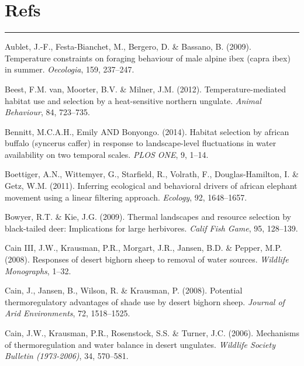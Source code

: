 \documentclass[10pt,twocolumn]{paper}
\begin{document}
\section{Refs}\label{refs}

\begin{center}\rule{0.5\linewidth}{\linethickness}\end{center}

\hypertarget{refs}{}
\hypertarget{ref-Aublet2009}{}
Aublet, J.-F., Festa-Bianchet, M., Bergero, D. \& Bassano, B. (2009).
Temperature constraints on foraging behaviour of male alpine ibex (capra
ibex) in summer. \emph{Oecologia}, 159, 237--247.

\hypertarget{ref-VANBEEST2012723}{}
Beest, F.M. van, Moorter, B.V. \& Milner, J.M. (2012).
Temperature-mediated habitat use and selection by a heat-sensitive
northern ungulate. \emph{Animal Behaviour}, 84, 723--735.

\hypertarget{ref-bennitt2014buffalo}{}
Bennitt, M.C.A.H., Emily AND Bonyongo. (2014). Habitat selection by
african buffalo (syncerus caffer) in response to landscape-level
fluctuations in water availability on two temporal scales. \emph{PLOS
ONE}, 9, 1--14.

\hypertarget{ref-ECY:ECY20119281648}{}
Boettiger, A.N., Wittemyer, G., Starfield, R., Volrath, F.,
Douglas-Hamilton, I. \& Getz, W.M. (2011). Inferring ecological and
behavioral drivers of african elephant movement using a linear filtering
approach. \emph{Ecology}, 92, 1648--1657.

\hypertarget{ref-bowyer2009thermal}{}
Bowyer, R.T. \& Kie, J.G. (2009). Thermal landscapes and resource
selection by black-tailed deer: Implications for large herbivores.
\emph{Calif Fish Game}, 95, 128--139.

\hypertarget{ref-cain2008responses}{}
Cain III, J.W., Krausman, P.R., Morgart, J.R., Jansen, B.D. \& Pepper,
M.P. (2008). Responses of desert bighorn sheep to removal of water
sources. \emph{Wildlife Monographs}, 1--32.

\hypertarget{ref-CAIN20081518}{}
Cain, J., Jansen, B., Wilson, R. \& Krausman, P. (2008). Potential
thermoregulatory advantages of shade use by desert bighorn sheep.
\emph{Journal of Arid Environments}, 72, 1518--1525.

\hypertarget{ref-cain_etal_2006}{}
Cain, J.W., Krausman, P.R., Rosenstock, S.S. \& Turner, J.C. (2006).
Mechanisms of thermoregulation and water balance in desert ungulates.
\emph{Wildlife Society Bulletin (1973-2006)}, 34, 570--581.
\end{document}
